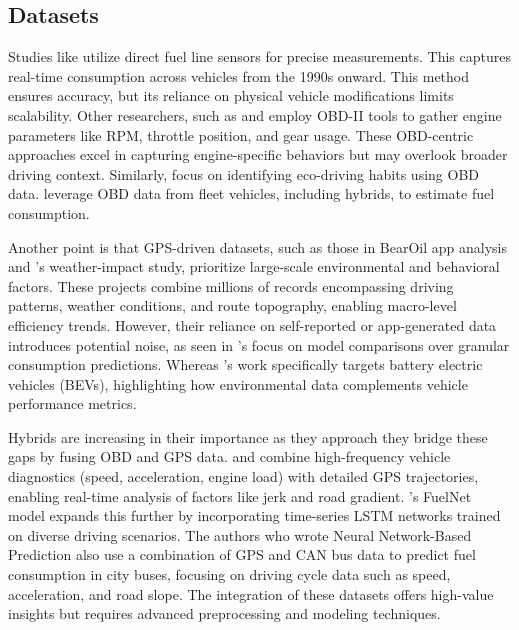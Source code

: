 \documentclass[letterpaper]{article}
\begin{document}
\subsection*{Datasets}

Studies like \cite{al2007experimental} utilize direct fuel line sensors for precise
measurements. This captures real-time consumption across vehicles from the 1990s onward. 
This method ensures accuracy, but its reliance on physical vehicle modifications limits 
scalability. Other researchers, such as \cite{rykala2023modeling} and \cite{abukhalil2020fuel} 
employ OBD-II tools to gather engine parameters like RPM, throttle position, and gear usage. 
These OBD-centric approaches excel in capturing engine-specific behaviors but may overlook 
broader driving context. Similarly, \cite{Manjunath2024} focus on identifying eco-driving 
habits using OBD data. \cite{abediasl2024real} leverage OBD data from fleet vehicles, 
including hybrids, to estimate fuel consumption. 

Another point is that GPS-driven datasets, such as those in \cite{yang2022predicting} BearOil 
app analysis and \cite{filla2025using}'s weather-impact study, prioritize large-scale 
environmental and behavioral factors. These projects combine millions of records encompassing
driving patterns, weather conditions, and route topography, enabling macro-level efficiency 
trends. However, their reliance on self-reported or app-generated data introduces potential 
noise, as seen in \cite{yang2022predicting}'s focus on model comparisons over granular 
consumption predictions. Whereas \cite{filla2025using}'s work specifically targets battery 
electric vehicles (BEVs), highlighting how environmental data complements vehicle performance 
metrics. 

Hybrids are increasing in their importance as they approach they bridge these gaps by fusing
OBD and GPS data. \cite{zhang2023novel} and \cite{yen_combining_2021} combine high-frequency 
vehicle diagnostics (speed, acceleration, engine load) with detailed GPS trajectories,
enabling real-time analysis of factors like jerk and road gradient. \cite{wang2020fuelnet}'s 
FuelNet model expands this further by incorporating time-series LSTM networks trained on 
diverse driving scenarios. The authors who wrote Neural Network-Based Prediction also use a 
combination of GPS and CAN bus data to predict fuel consumption in city buses, focusing on 
driving cycle data such as speed, acceleration, and road slope. The integration of these 
datasets offers high-value insights but requires advanced preprocessing and modeling techniques.
\end{document}
